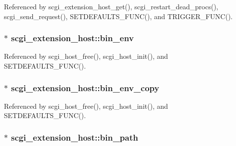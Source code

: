 Referenced by scgi\-\_\-extension\-\_\-host\-\_\-get(), scgi\-\_\-restart\-\_\-dead\-\_\-procs(), scgi\-\_\-send\-\_\-request(), S\-E\-T\-D\-E\-F\-A\-U\-L\-T\-S\-\_\-\-F\-U\-N\-C(), and T\-R\-I\-G\-G\-E\-R\-\_\-\-F\-U\-N\-C().

\hypertarget{structscgi__extension__host_af07506e6cd8a5722109417d0ac7f72c1}{
\subsubsection[{bin\-\_\-env}]{$\ast$ scgi\-\_\-extension\-\_\-host\-::bin\-\_\-env}}\label{structscgi__extension__host_af07506e6cd8a5722109417d0ac7f72c1}


Referenced by scgi\-\_\-host\-\_\-free(), scgi\-\_\-host\-\_\-init(), and S\-E\-T\-D\-E\-F\-A\-U\-L\-T\-S\-\_\-\-F\-U\-N\-C().

\hypertarget{structscgi__extension__host_aefbb04a489c6375bf40c4d758aa28fd8}{
\subsubsection[{bin\-\_\-env\-\_\-copy}]{$\ast$ scgi\-\_\-extension\-\_\-host\-::bin\-\_\-env\-\_\-copy}}\label{structscgi__extension__host_aefbb04a489c6375bf40c4d758aa28fd8}


Referenced by scgi\-\_\-host\-\_\-free(), scgi\-\_\-host\-\_\-init(), and S\-E\-T\-D\-E\-F\-A\-U\-L\-T\-S\-\_\-\-F\-U\-N\-C().

\hypertarget{structscgi__extension__host_aed691240580b2f76281de8c24806d868}{
\subsubsection[{bin\-\_\-path}]{$\ast$ scgi\-\_\-extension\-\_\-host\-::bin\-\_\-path}}\label{structscgi__extension__host_aed691240580b2f76281de8c24806d868}


